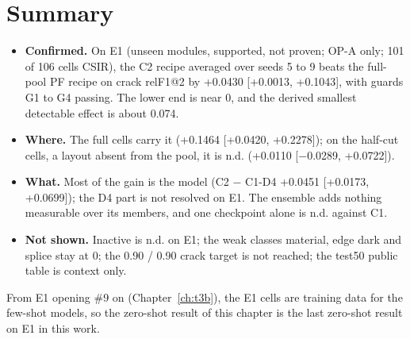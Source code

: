 \section{Summary}\label{sec:e1-summary}

\begin{itemize}
  \item \textbf{Confirmed.} On E1 (unseen modules, supported, not proven; OP-A only; 101 of 106 cells CSIR), the C2 recipe
  averaged over seeds 5 to 9 beats the full-pool PF recipe on crack relF1@2 by +0.0430 [+0.0013, +0.1043], with guards G1 to G4
  passing. The lower end is near 0, and the derived smallest detectable effect is about 0.074.
  \item \textbf{Where.} The full cells carry it (+0.1464 [+0.0420, +0.2278]); on the half-cut cells, a layout absent from the
  pool, it is n.d. (+0.0110 [$-$0.0289, +0.0722]).
  \item \textbf{What.} Most of the gain is the model (C2 $-$ C1-D4 +0.0451 [+0.0173, +0.0699]); the D4 part is not resolved on
  E1. The ensemble adds nothing measurable over its members, and one checkpoint alone is n.d. against C1.
  \item \textbf{Not shown.} Inactive is n.d. on E1; the weak classes material, edge dark and splice stay at 0; the 0.90 / 0.90
  crack target is not reached; the test50 public table is context only.
\end{itemize}

From E1 opening \#9 on (Chapter~\ref{ch:t3b}), the E1 cells are training data for the few-shot models, so the zero-shot
result of this chapter is the last zero-shot result on E1 in this work.

